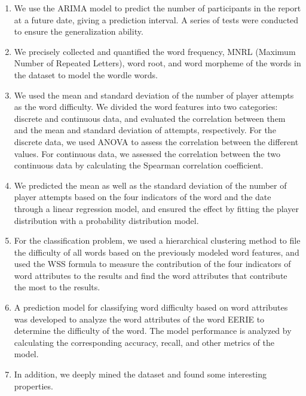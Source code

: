 \documentclass[12pt]{article}  %
\begin{document}
\begin{enumerate}[\bfseries 1.]
	\setlength{\parsep}{0ex} %
	\setlength{\topsep}{2ex} %
	\setlength{\itemsep}{1ex} %
	\item We use the ARIMA model to predict the number of participants in the report at a future date, giving a prediction interval. A series of tests were conducted to ensure the generalization ability.
	\item We precisely collected and quantified the word frequency, MNRL (Maximum Number of Repeated Letters), word root, and word morpheme of the words in the dataset to model the wordle words.  
	\item We used the mean and standard deviation of the number of player attempts as the word difficulty. We divided the word features into two categories: discrete and continuous data, and evaluated the correlation between them and the mean and standard deviation of attempts, respectively. For the discrete data, we used ANOVA to assess the correlation between the different values. For continuous data, we assessed the correlation between the two continuous data by calculating the Spearman correlation coefficient.  
	\item We predicted the mean as well as the standard deviation of the number of player attempts based on the four indicators of the word and the date through a linear regression model, and ensured the effect by fitting the player distribution with a probability distribution model.
	\item For the classification problem, we used a hierarchical clustering method to file the difficulty of all words based on the previously modeled word features, and used the WSS formula to measure the contribution of the four indicators of word attributes to the results and find the word attributes that contribute the most to the results.
	\item A prediction model for classifying word difficulty based on word attributes was developed to analyze the word attributes of the word EERIE to determine the difficulty of the word. The model performance is analyzed by calculating the corresponding accuracy, recall, and other metrics of the model.  
	\item In addition, we deeply mined the dataset and found some interesting properties.
\end{enumerate}


\end{document}
